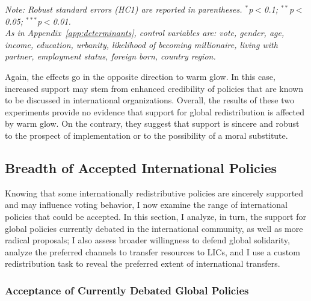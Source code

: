 \documentclass[12pt,english]{article}
\begin{document}
\begin{bibunit}
\begin{table}[!htbp] 
  \caption[Effect on support for global redistribution of believing that it is likely]{Effect on support for global redistribution of believing that it is likely.}\label{tab:iv} 
  \makebox[\textwidth][c]{} %
  \textit{Note: Robust standard errors (HC1) are reported in parentheses. \hfill %
  $^{*}$p$<$0.1; $^{**}$p$<$0.05; $^{***}$p$<$0.01. \\ %
  As in Appendix~\ref{app:determinants}, control variables are: vote, gender, age, income, education, urbanity, likelihood of becoming millionaire, living with partner, employment status, foreign born, country region.}
\end{table}

Again, the effects go in the opposite direction to warm glow. In this case, increased support may stem from enhanced credibility of policies that are known to be discussed in international organizations. 
Overall, the results of these two experiments provide no evidence that support for global redistribution is affected by warm glow. On the contrary, they suggest that support is sincere and robust to the prospect of implementation or to the possibility of a moral substitute.


\subsection{Breadth of Accepted International Policies\label{sec:breadth}}

Knowing that some internationally redistributive policies are sincerely supported and may influence voting behavior, I now examine the range of international policies that could be accepted. In this section, I analyze, in turn, the support for global policies currently debated in the international community, as well as more radical proposals; I also assess broader willingness to defend global solidarity, analyze the preferred channels to transfer resources to LICs, and I use a custom redistribution task to reveal the preferred extent of international transfers. 

\subsubsection{Acceptance of Currently Debated Global Policies}\label{subsec:debated}


\end{bibunit}
\end{document}
